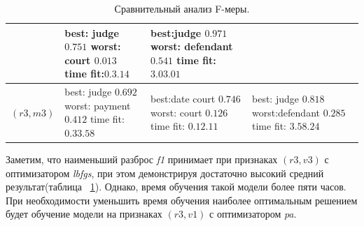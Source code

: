 \documentclass{csmathnotes}
\begin{document}
\begin{table}[!h]
\begin{center}
\begin{tabular}{|p{2.1cm}|p{2.5cm}|p{2.5cm}|p{2.5cm}|}
            & best: \newline judge    $0.751$ \newline
              worst: \newline court  $0.013$ \newline
              time fit:\newline $0.3.14$
            & best:\newline  judge $0.971$\newline
              worst: \newline defendant  $0.541$\newline
              time fit:\newline $3.03.01$\\
            \hline
            $(r3, m3)$
            & best: \newline judge $0.692$ \newline
            worst: \newline payment $0.412$ \newline
            time fit: \newline  $0.33.58$
            & best:\newline   date court   $0.746$ \newline
             worst: \newline court $0.126$ \newline
             time fit: \newline $0.12.11$
            & best: \newline   judge $0.818$ \newline
              worst:\newline defendant $0.285$ \newline 
              time fit: \newline $3.58.24$\\
            \hline
        \end{tabular}
    \end{center}
    \caption{\label{tabl:table2}Сравнительный анализ F-меры.}
\end{table}

Заметим, что наименьший разброс \emph{f1}  принимает при признаках $(r3,v3)$ с оптимизатором \emph{lbfgs}, при этом демонстрируя достаточно высокий средний результат(таблица ~\ref{tabl:table2}). Однако, время обучения такой модели более пяти часов. При необходимости уменьшить время обучения наиболее оптимальным решением будет обучение модели на признаках $(r3,v1)$ с оптимизатором \emph{pa}.
\end{document}
